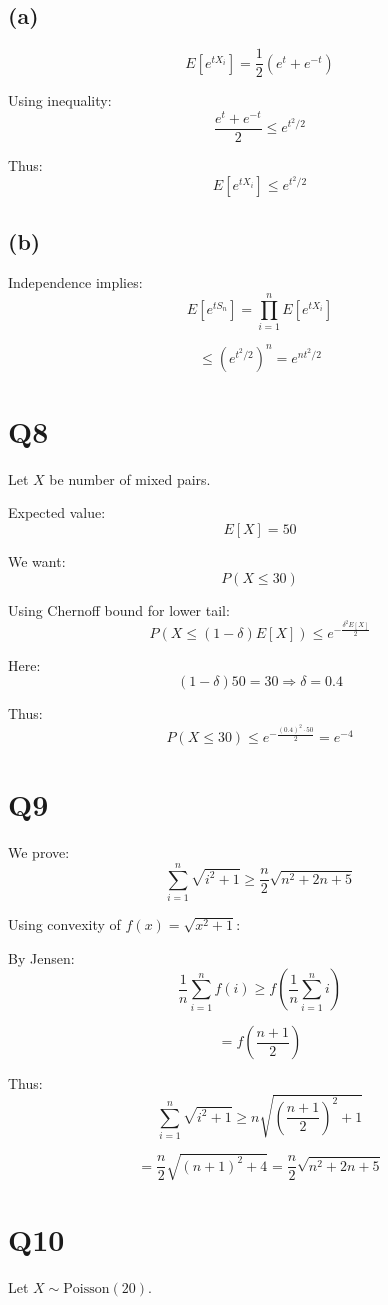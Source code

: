 \documentclass[12pt]{article}
\begin{document}
\subsection*{(a)}
\[
E[e^{tX_i}] = \frac{1}{2}(e^t + e^{-t})
\]

Using inequality:
\[
\frac{e^t + e^{-t}}{2} \leq e^{t^2/2}
\]

Thus:
\[
E[e^{tX_i}] \leq e^{t^2/2}
\]

\subsection*{(b)}
Independence implies:
\[
E[e^{tS_n}] = \prod_{i=1}^n E[e^{tX_i}]
\]

\[
\leq (e^{t^2/2})^n = e^{nt^2/2}
\]

\section*{Q8}
Let $X$ be number of mixed pairs.

Expected value:
\[
E[X] = 50
\]

We want:
\[
P(X \leq 30)
\]

Using Chernoff bound for lower tail:
\[
P(X \leq (1-\delta)E[X]) \leq e^{-\frac{\delta^2 E[X]}{2}}
\]

Here:
\[
(1-\delta)50 = 30 \Rightarrow \delta = 0.4
\]

Thus:
\[
P(X \leq 30) \leq e^{-\frac{(0.4)^2 \cdot 50}{2}} = e^{-4}
\]

\section*{Q9}
We prove:
\[
\sum_{i=1}^n \sqrt{i^2+1} \geq \frac{n}{2}\sqrt{n^2+2n+5}
\]

Using convexity of $f(x)=\sqrt{x^2+1}$:

By Jensen:
\[
\frac{1}{n}\sum_{i=1}^n f(i) \geq f\left(\frac{1}{n}\sum_{i=1}^n i\right)
\]

\[
= f\left(\frac{n+1}{2}\right)
\]

Thus:
\[
\sum_{i=1}^n \sqrt{i^2+1} \geq n \sqrt{\left(\frac{n+1}{2}\right)^2 + 1}
\]

\[
= \frac{n}{2}\sqrt{(n+1)^2 + 4}
= \frac{n}{2}\sqrt{n^2+2n+5}
\]

\section*{Q10}
Let $X \sim \text{Poisson}(20)$.
\end{document}
